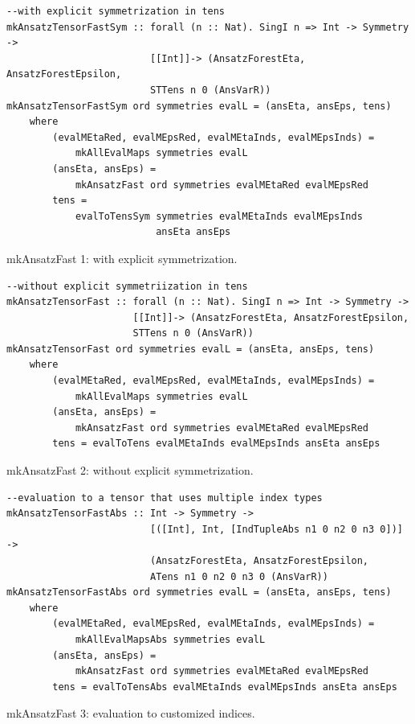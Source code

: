 \documentclass[a4paper,12pt, DIV=14, BCOR=5mm, twoside, headsepline, numbers=noenddot]{scrbook}
\begin{document}
\begin{listing}[hbt!]
\begin{verbatim}
--with explicit symmetrization in tens
mkAnsatzTensorFastSym :: forall (n :: Nat). SingI n => Int -> Symmetry ->
                         [[Int]]-> (AnsatzForestEta, AnsatzForestEpsilon,
                         STTens n 0 (AnsVarR))
mkAnsatzTensorFastSym ord symmetries evalL = (ansEta, ansEps, tens)
    where
        (evalMEtaRed, evalMEpsRed, evalMEtaInds, evalMEpsInds) =
            mkAllEvalMaps symmetries evalL 
        (ansEta, ansEps) =
            mkAnsatzFast ord symmetries evalMEtaRed evalMEpsRed
        tens =
            evalToTensSym symmetries evalMEtaInds evalMEpsInds
                          ansEta ansEps
\end{verbatim} 
\caption{mkAnsatzFast 1: with explicit symmetrization.}\label{mkAnsatzFast1}
\end{listing}

\begin{listing}[hbt!]
\begin{verbatim}
--without explicit symmetriization in tens
mkAnsatzTensorFast :: forall (n :: Nat). SingI n => Int -> Symmetry ->
                      [[Int]]-> (AnsatzForestEta, AnsatzForestEpsilon,
                      STTens n 0 (AnsVarR))
mkAnsatzTensorFast ord symmetries evalL = (ansEta, ansEps, tens)
    where
        (evalMEtaRed, evalMEpsRed, evalMEtaInds, evalMEpsInds) =
            mkAllEvalMaps symmetries evalL 
        (ansEta, ansEps) =
            mkAnsatzFast ord symmetries evalMEtaRed evalMEpsRed
        tens = evalToTens evalMEtaInds evalMEpsInds ansEta ansEps
\end{verbatim} 
\caption{mkAnsatzFast 2: without explicit symmetrization.}\label{mkAnsatzFast2}
\end{listing}

\begin{listing}[hbt!]
\begin{verbatim}
--evaluation to a tensor that uses multiple index types
mkAnsatzTensorFastAbs :: Int -> Symmetry ->
                         [([Int], Int, [IndTupleAbs n1 0 n2 0 n3 0])] ->
                         (AnsatzForestEta, AnsatzForestEpsilon,
                         ATens n1 0 n2 0 n3 0 (AnsVarR))
mkAnsatzTensorFastAbs ord symmetries evalL = (ansEta, ansEps, tens)
    where
        (evalMEtaRed, evalMEpsRed, evalMEtaInds, evalMEpsInds) =
            mkAllEvalMapsAbs symmetries evalL 
        (ansEta, ansEps) =
            mkAnsatzFast ord symmetries evalMEtaRed evalMEpsRed
        tens = evalToTensAbs evalMEtaInds evalMEpsInds ansEta ansEps
\end{verbatim} 
\caption{mkAnsatzFast 3: evaluation to customized indices.}\label{mkAnsatzFast3}
\end{listing}
\end{document}

